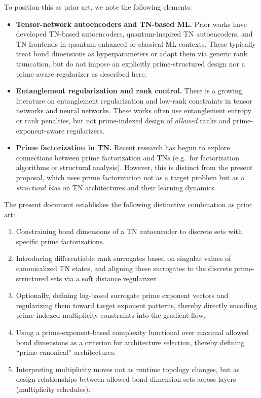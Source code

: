 \documentclass[11pt]{article}
\begin{document}
To position this as prior art, we note the following elements:

\begin{itemize}[leftmargin=1.5em]
    \item \textbf{Tensor-network autoencoders and TN-based ML.} Prior works have developed TN-based autoencoders, quantum-inspired TN autoencoders, and TN frontends in quantum-enhanced or classical ML contexts. These typically treat bond dimensions as hyperparameters or adapt them via generic rank truncation, but do not impose an explicitly prime-structured design nor a prime-aware regularizer as described here.

    \item \textbf{Entanglement regularization and rank control.} There is a growing literature on entanglement regularization and low-rank constraints in tensor networks and neural networks. These works often use entanglement entropy or rank penalties, but not prime-indexed design of \emph{allowed} ranks and prime-exponent-aware regularizers.

    \item \textbf{Prime factorization in TN.} Recent research has begun to explore connections between prime factorization and TNs (e.g.\ for factorization algorithms or structural analysis). However, this is distinct from the present proposal, which uses prime factorization not as a target problem but as a \emph{structural bias} on TN architectures and their learning dynamics.
\end{itemize}

The present document establishes the following distinctive combination as prior art:
\begin{enumerate}[leftmargin=1.5em]
    \item Constraining bond dimensions of a TN autoencoder to discrete sets with specific prime factorizations.

    \item Introducing differentiable rank surrogates based on singular values of canonicalized TN states, and aligning these surrogates to the discrete prime-structured sets via a soft distance regularizer.

    \item Optionally, defining log-based surrogate prime exponent vectors and regularizing them toward target exponent patterns, thereby directly encoding prime-indexed multiplicity constraints into the gradient flow.

    \item Using a prime-exponent-based complexity functional over maximal allowed bond dimensions as a criterion for architecture selection, thereby defining ``prime-canonical'' architectures.

    \item Interpreting multiplicity moves not as runtime topology changes, but as design relationships between allowed bond dimension sets across layers (multiplicity schedules).
\end{enumerate}
\end{document}
